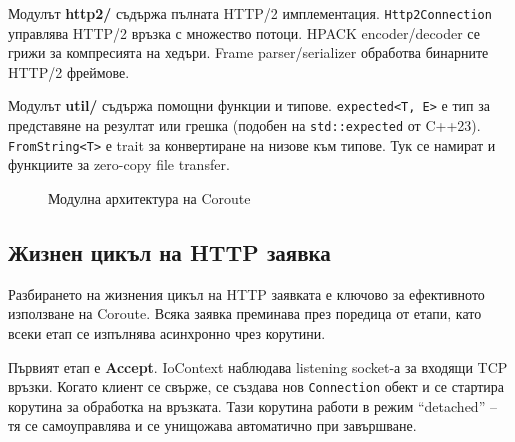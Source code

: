 Модулът \textbf{http2/} съдържа пълната HTTP/2 имплементация. \texttt{Http2Connection} управлява HTTP/2 връзка с множество потоци. HPACK encoder/decoder се грижи за компресията на хедъри. Frame parser/serializer обработва бинарните HTTP/2 фреймове.

Модулът \textbf{util/} съдържа помощни функции и типове. \texttt{expected<T, E>} е тип за представяне на резултат или грешка (подобен на \texttt{std::expected} от C++23). \texttt{FromString<T>} е trait за конвертиране на низове към типове. Тук се намират и функциите за zero-copy file transfer.

\begin{figure}[H]
\centering
{}
\caption{Модулна архитектура на Coroute}
\label{fig:architecture}
\end{figure}

\subsection{Жизнен цикъл на HTTP заявка}

Разбирането на жизнения цикъл на HTTP заявката е ключово за ефективното използване на Coroute. Всяка заявка преминава през поредица от етапи, като всеки етап се изпълнява асинхронно чрез корутини.

Първият етап е \textbf{Accept}. IoContext наблюдава listening socket-а за входящи TCP връзки. Когато клиент се свърже, се създава нов \texttt{Connection} обект и се стартира корутина за обработка на връзката. Тази корутина работи в режим ``detached'' -- тя се самоуправлява и се унищожава автоматично при завършване.

